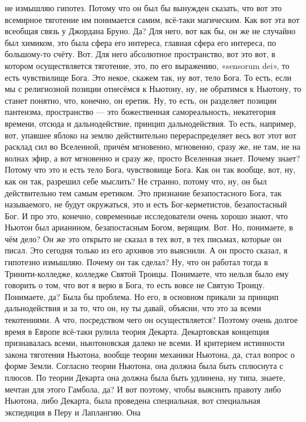 не измышляю гипотез. Потому что он был бы вынужден сказать, что вот это
всемирное тяготение им понимается самим, всё-таки магическим. Как вот эта вот
всеобщая связь у Джордана Бруно. Да? Для него, вот как бы, он же не случайно был
химиком, это была сфера его интереса, главная сфера его интереса, по большому-то
счёту. Вот. Для него абсолютное пространство, вот это вот, в котором
осуществляется тяготение, это, по его выражению, «sensorum dei», то есть
чувствилище Бога. Это некое, скажем так, ну вот, тело Бога. То есть, если мы с
религиозной позиции отнесёмся к Ньютону, ну, не обратимся к Ньютону, то станет
понятно, что, конечно, он еретик. Ну, то есть, он разделяет позиции пантеизма,
пространство — это божественная самореальность, некатегория времени, отсюда и
дальнодействие, принцип дальнодействия. То есть, например, вот, упавшее яблоко
на землю действительно перераспределяет весь вот этот вот расклад сил во
Вселенной, причём мгновенно, мгновенно, сразу же, не там, не на волнах эфир, а
вот мгновенно и сразу же, просто Вселенная знает. Почему знает? Потому что это и
есть тело Бога, чувствовище Бога. Как он так вообще, вот, ну, как он так,
разрешил себе мыслить? Не странно, потому что, ну, он был действительно тем
самым еретиком. Это признание безапостасного Бога, так называемого, не будут
окружаться, это и есть Бог-керметистов, безапостасный Бог. И про это, конечно,
современные исследователи очень хорошо знают, что Ньютон был арианином,
безапостасным Богом, верящим. Вот. Но, понимаете, в чём дело? Он же это открыто
не сказал в тех вот, в тех письмах, которые он писал. Это сегодня только из его
архивов это выяснили. А он просто сказал, я гипотезно измышляю. Почему он так
сделал? Ну, что он работал тогда в Тринити-колледже, колледже Святой Троицы.
Понимаете, что нельзя было ему говорить о том, что вот я верю в Бога, то есть
вовсе не Святую Троицу. Понимаете, да? Была бы проблема. Но его, в основном
прикали за принцип дальнодействия и за то, что он, ну ты давай, объясни, что это
за всеми текотениями. А что, посредством чего он осуществляется? Поэтому очень
долгое время в Европе всё-таки рулила теория Декарта. Декартовская концепция
признавалась всеми, ньютоновская далеко не всеми. И критерием истинности закона
тяготения Ньютона, вообще теории механики Ньютона, да, стал вопрос о форме
Земли. Согласно теории Ньютона, она должна была быть сплюснута с плюсов. По
теории Декарта она должна была быть удлинена, ну типа, знаете, мечтан для этого
Гамбола, да? И вот поэтому, чтобы выяснить правоту либо Ньютона, либо Декарта,
была проведена специальная, вот специальная экспедиция в Перу и Лаплангию. Она
